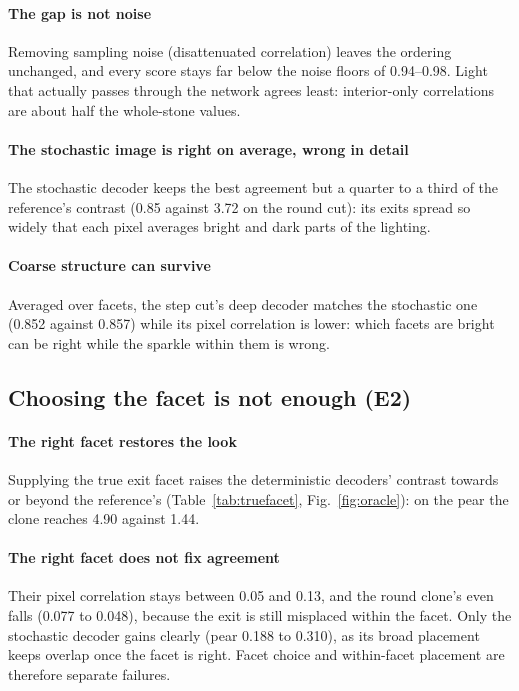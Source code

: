 \documentclass[conference]{IEEEtran}
\begin{document}
\paragraph{The gap is not noise} Removing sampling noise (disattenuated
correlation) leaves the ordering unchanged, and every score stays far below the
noise floors of 0.94--0.98. Light that actually passes through the network
agrees least: interior-only correlations are about half the whole-stone values.

\paragraph{The stochastic image is right on average, wrong in detail} The
stochastic decoder keeps the best agreement but a quarter to a third of the
reference's contrast (0.85 against 3.72 on the round cut): its exits spread so
widely that each pixel averages bright and dark parts of the lighting.

\paragraph{Coarse structure can survive} Averaged over facets, the step cut's
deep decoder matches the stochastic one (0.852 against 0.857) while its pixel
correlation is lower: which facets are bright can be right while the sparkle
within them is wrong.

\subsection{Choosing the facet is not enough (E2)}

\paragraph{The right facet restores the look} Supplying the true exit facet
raises the deterministic decoders' contrast towards or beyond the reference's
(Table~\ref{tab:truefacet}, Fig.~\ref{fig:oracle}): on the pear the clone
reaches 4.90 against 1.44.

\paragraph{The right facet does not fix agreement} Their pixel correlation
stays between 0.05 and 0.13, and the round clone's even falls (0.077 to 0.048),
because the exit is still misplaced within the facet. Only the stochastic decoder gains clearly (pear 0.188 to 0.310), as its
broad placement keeps overlap once the facet is right. Facet choice and
within-facet placement are therefore separate failures.
\end{document}
